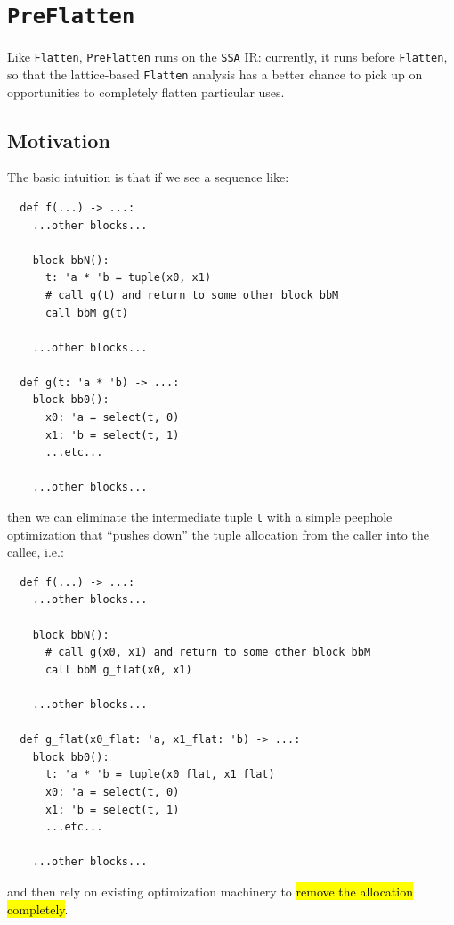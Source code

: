 \documentclass[leqno,11pt]{article}
\begin{document}


\section{\texttt{PreFlatten}}

Like \texttt{Flatten}, \texttt{PreFlatten} runs on the \texttt{SSA} IR:
currently, it runs before \texttt{Flatten}, so that the lattice-based
\texttt{Flatten} analysis has a better chance to pick up on opportunities to
completely flatten particular uses.

\subsection{Motivation}
The basic intuition is that if we see a sequence like:
\begin{verbatim}
  def f(...) -> ...:
    ...other blocks...

    block bbN():
      t: 'a * 'b = tuple(x0, x1)
      # call g(t) and return to some other block bbM
      call bbM g(t)

    ...other blocks...

  def g(t: 'a * 'b) -> ...:
    block bb0():
      x0: 'a = select(t, 0)
      x1: 'b = select(t, 1)
      ...etc...

    ...other blocks...
\end{verbatim}
then we can eliminate the intermediate tuple \texttt{t} with a simple peephole
optimization that ``pushes down'' the tuple allocation from the caller into the
callee, i.e.:
\begin{verbatim}
  def f(...) -> ...:
    ...other blocks...

    block bbN():
      # call g(x0, x1) and return to some other block bbM
      call bbM g_flat(x0, x1)

    ...other blocks...

  def g_flat(x0_flat: 'a, x1_flat: 'b) -> ...:
    block bb0():
      t: 'a * 'b = tuple(x0_flat, x1_flat)
      x0: 'a = select(t, 0)
      x1: 'b = select(t, 1)
      ...etc...

    ...other blocks...
\end{verbatim}
and then rely on existing optimization machinery to \hl{remove the allocation
  completely}.
\end{document}
